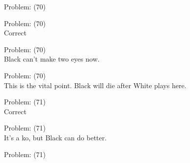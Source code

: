 \documentclass[11pt]{article}
\begin{document}
\begin{minipage}[t]{0.5\textwidth}
  {\centering
  
  Problem: (70)\\
  
  }
\end{minipage}
\begin{minipage}[t]{0.5\textwidth}
  {\centering
  
  Problem: (70)\\
  Correct\\
  }
\end{minipage}
\begin{minipage}[t]{0.5\textwidth}
  {\centering
  
  Problem: (70)\\
  Black can't make two eyes now.\\
  }
\end{minipage}
\begin{minipage}[t]{0.5\textwidth}
  {\centering
  
  Problem: (70)\\
  This is the vital point. Black will die after White plays here.\\
  }
\end{minipage}
\begin{minipage}[t]{0.5\textwidth}
  {\centering
  
  Problem: (71)\\
  Correct\\
  }
\end{minipage}
\begin{minipage}[t]{0.5\textwidth}
  {\centering
  
  Problem: (71)\\
  It's a ko, but Black can do better.\\
  }
\end{minipage}
\begin{minipage}[t]{0.5\textwidth}
  {\centering
  
  Problem: (71)\\
  
  }
\end{minipage}
\end{document}
